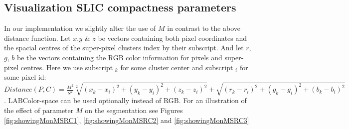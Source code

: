 \subsection{Visualization SLIC compactness parameters}\label{sec:slicParams}
In our implementation we slightly alter the use of $M$ in contrast to the above distance function. Let $x$,$y$ \& $z$ be vectors containing both pixel coordinates and the spacial centres of the super-pixel clusters index by their subscript. And let $r$, $g$, $b$ be the vectors containing the RGB color information for pixels and super-pixel centres. Here we use subscript $_k$ for some cluster center and subscript $_i$ for some pixel id:   	 $Distance(P,C) = \frac{M^2}{S^2}\sqrt[2]{(x_k -x_i)^2 + (y_k - y_i)^2 + (z_k - z_i)^2} + \sqrt{(r_k - r_i)^2+(g_k - g_i)^2+(b_k - b_i)^2} $. LABColor-space can be used optionally instead of RGB. For an illustration of the effect of parameter $M$ on the segmentation see Figures \ref{fig:showingMonMSRC1}, \ref{fig:showingMonMSRC2} and \ref{fig:showingMonMSRC3}

